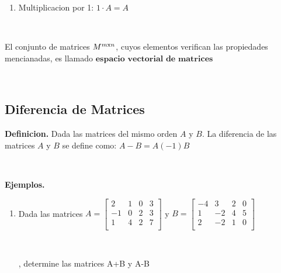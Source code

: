 \documentclass[11pt, conference]{IEEEtran}
\begin{document}
{\begin{enumerate}
    $\alpha(A+B) = \alpha\!A + \alpha\!B; \alpha \in \mathbb{R}$
       
    $A(\alpha+B) = \alpha\!A + \beta\!A; \alpha,\beta \in \mathbb{R}$
    \item Multiplicacion por 1: $1 \cdot A = A$ 
\end{enumerate}

\

El conjunto de matrices $M^{m\textnormal{x}n}$, cuyos elementos verifican las propiedades mencianadas, es llamado $\textbf{espacio vectorial de matrices}$

\

\subsection{Diferencia de Matrices}

\textbf{Definicion.} Dada las matrices del mismo orden $A$ y $B$. La diferencia de las matrices $A$ y $B$ se define como: $A-B=A(-1)B$

\

\textbf{Ejemplos.}
\begin{enumerate}
	\item Dada las matrices 
    $
      A = \left[
      \begin{array}{cccc}
      2 & 1 & 0 & 3 \\
      -1 & 0 & 2 & 3 \\
      1 & 4 & 2 & 7\\
      \end{array}
      \right]
    $ y $
      B = \left[
      \begin{array}{cccc}
      -4 & 3 & 2 & 0 \\
      1 & -2 & 4 & 5 \\
      2 & -2 & 1 & 0\\
      \end{array}
      \right]
    $
    
    \
    
    , determine las matrices A+B y A-B
    
    \
    

\end{enumerate}}
\end{document}
